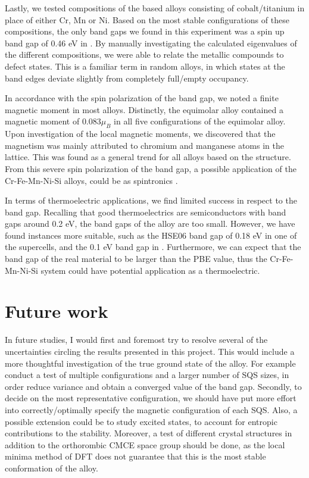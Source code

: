 \documentclass[UKenglish]{ifimaster}  %
\begin{document}
Lastly, we tested compositions of the  based alloys consisting of cobalt/titanium in place of either Cr, Mn or Ni. Based on the most stable configurations of these compositions, the only band gaps we found in this experiment was a spin up band gap of 0.46 eV in . By manually investigating the calculated eigenvalues of the different compositions, we were able to relate the metallic compounds to defect states. This is a familiar term in random alloys, in which states at the band edges deviate slightly from completely full/empty occupancy.  

In accordance with the spin polarization of the band gap, we noted a finite magnetic moment in most alloys.  Distinctly, the equimolar alloy contained a magnetic moment of $0.083 \mu_B$ in all five configurations of the equimolar alloy. Upon investigation of the local magnetic moments, we discovered that the magnetism was mainly attributed to chromium and manganese atoms in the lattice. This was found as a general trend for all alloys based on the  structure. From this severe spin polarization of the band gap, a possible application of the Cr-Fe-Mn-Ni-Si alloys, could be as spintronics \cite{spintronic}. 

In terms of thermoelectric applications, we find limited success in respect to the band gap. Recalling that good thermoelectrics are semiconductors with band gaps around 0.2 eV, the band gaps of the  alloy are too small. However, we have found instances more suitable, such as the HSE06 band gap of 0.18 eV in one of the supercells, and the 0.1 eV band gap in . Furthermore, we can expect that the band gap of the real material to be larger than the PBE value, thus the Cr-Fe-Mn-Ni-Si system could have potential application as a thermoelectric.

\chapter{Future work}

In future studies, I would first and foremost try to resolve several of the uncertainties circling the results presented in this project. This would include a more thoughtful investigation of the true ground state of the  alloy. For example conduct a test of multiple configurations and a larger number of SQS sizes, in order reduce variance and obtain a converged value of the band gap. Secondly, to decide on the most representative configuration, we should have put more effort into correctly/optimally specify the magnetic configuration of each SQS. Also, a possible extension could be to study excited states, to account for entropic contributions to the stability.  Moreover, a test of different crystal structures in addition to the orthorombic CMCE space group should be done, as the local minima method of DFT does not guarantee that this is the most stable conformation of the alloy.
\end{document}
